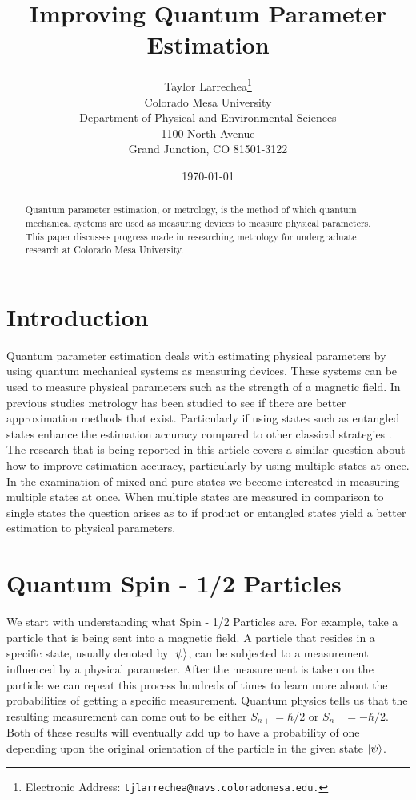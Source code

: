 \documentclass[twocolumn]{article}
\title{\textbf{Improving Quantum Parameter Estimation}}
\author{Taylor Larrechea\footnote{Electronic Address: \texttt{tjlarrechea@mavs.coloradomesa.edu.}} \\
    Colorado Mesa University \\
    Department of Physical and Environmental Sciences \\
    1100 North Avenue \\
    Grand Junction, CO 81501-3122}
\date{\today}
\begin{document}
\maketitle
\begin{abstract}
Quantum parameter estimation, or metrology, is the method of which quantum mechanical systems are used as measuring devices to measure physical parameters. This paper discusses progress made in researching metrology for undergraduate research at Colorado Mesa University.
\end{abstract}
\section*{Introduction}
Quantum parameter estimation deals with estimating physical parameters by using quantum mechanical systems as measuring devices. These systems can be used to measure physical parameters such as the strength of a magnetic field. In previous studies metrology has been studied to see if there are better approximation methods that exist. Particularly if using states such as entangled states enhance the estimation accuracy compared to other classical strategies \cite{D. Collins}. The research that is being reported in this article covers a similar question about how to improve estimation accuracy, particularly by using multiple states at once. In the examination of mixed and pure states we become interested in measuring multiple states at once. When multiple states are measured in comparison to single states the question arises as to if product or entangled states yield a better estimation to physical parameters.
\section*{Quantum Spin - 1/2 Particles}
We start with understanding what Spin - 1/2 Particles are. For example, take a particle that is being sent into a magnetic field. A particle that resides in a specific state, usually denoted by $\ket{\psi}$, can be subjected to a measurement influenced by a physical parameter. After the measurement is taken on the particle we can repeat this process hundreds of times to learn more about the probabilities of getting a specific measurement. Quantum physics tells us that the resulting measurement can come out to be either $S_{n+}=\hbar/2$ or $S_{n-}=-\hbar/2$. Both of these results will eventually add up to have a probability of one depending upon the original orientation of the particle in the given state $\ket{\psi}$.
\end{document}
